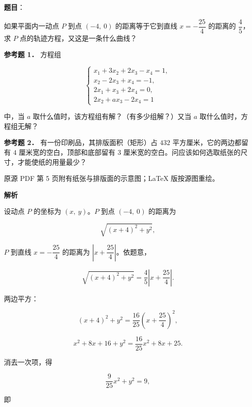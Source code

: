 \begin{answer}

\textbf{题目}：

如果平面内一动点 $P$ 到点 $(-4,\ 0)$ 的距离等于它到直线 $x=-\dfrac{25}{4}$ 的距离的 $\dfrac{4}{5}$，求 $P$ 点的轨迹方程，又这是一条什么曲线？

\textbf{参考题 1．} 方程组

\nopagebreak[4]
\[
\begin{cases}
x_1+3x_2+2x_3-x_4=1,\\
x_2-2x_3+x_4=-1,\\
2x_1+x_3+2x_4=0,\\
2x_2+ax_3-2x_4=1
\end{cases}
\]

中，当 $a$ 取什么值时，该方程组有解？（有多少组解？）又当 $a$ 取什么值时，方程组无解？

\textbf{参考题 2．} 有一份印刷品，其排版面积（矩形）占 $432$ 平方厘米，它的两边都留有 $4$ 厘米宽的空白，顶部和底部留有 $3$ 厘米宽的空白。问应该如何选取纸张的尺寸，才能使纸的用量最少？

\begin{gktip}
原源 PDF 第 5 页附有纸张与排版面的示意图；LaTeX 版按源图重绘。
\end{gktip}
\nopagebreak[4]
\begin{center}\end{center}
\nopagebreak[4]
\textbf{解析}

设动点 $P$ 的坐标为 $(x,\ y)$。$P$ 到点 $(-4,\ 0)$ 的距离为

\nopagebreak[4]
\[
\sqrt{(x+4)^2+y^2},
\]

$P$ 到直线 $x=-\dfrac{25}{4}$ 的距离为 $\left|x+\dfrac{25}{4}\right|$。依题意，

\nopagebreak[4]
\[
\sqrt{(x+4)^2+y^2}=\frac{4}{5}\left|x+\frac{25}{4}\right|.
\]

两边平方：

\nopagebreak[4]
\[
(x+4)^2+y^2=\frac{16}{25}\left(x+\frac{25}{4}\right)^2,
\]

\nopagebreak[4]
\[
x^2+8x+16+y^2=\frac{16}{25}x^2+8x+25.
\]

消去一次项，得

\nopagebreak[4]
\[
\frac{9}{25}x^2+y^2=9,
\]

即


\end{answer}
